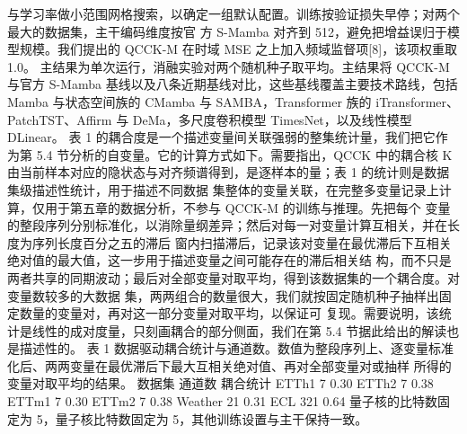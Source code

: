\documentclass[
]{article}
\begin{document}
与学习率做小范围网格搜索，以确定一组默认配置。训练按验证损失早停；对两个最大的数据集，主干编码维度按官
方 S-Mamba 对齐到 512，避免把增益误归于模型规模。我们提出的 QCCK-M
在时域 MSE 之上加入频域监督项{[}8{]}，该项权重取 1.0。
主结果为单次运行，消融实验对两个随机种子取平均。主结果将 QCCK-M 与官方
S-Mamba 基线以及八条近期基线对比，这些基线覆盖主要技术路线，包括 Mamba
与状态空间族的 CMamba 与 SAMBA，Transformer 族的
iTransformer、PatchTST、Affirm 与 DeMa，多尺度卷积模型
TimesNet，以及线性模型 DLinear。 表 1
的耦合度是一个描述变量间关联强弱的整集统计量，我们把它作为第 5.4
节分析的自变量。它的计算方式如下。需要指出，QCCK 中的耦合核 K
由当前样本对应的隐状态与对齐频谱得到，是逐样本的量；表 1
的统计则是数据集级描述性统计，用于描述不同数据
集整体的变量关联，在完整多变量记录上计算，仅用于第五章的数据分析，不参与
QCCK-M 的训练与推理。先把每个
变量的整段序列分别标准化，以消除量纲差异；然后对每一对变量计算互相关，并在长度为序列长度百分之五的滞后
窗内扫描滞后，记录该对变量在最优滞后下互相关绝对值的最大值，这一步用于描述变量之间可能存在的滞后相关结
构，而不只是两者共享的同期波动；最后对全部变量对取平均，得到该数据集的一个耦合度。对变量数较多的大数据
集，两两组合的数量很大，我们就按固定随机种子抽样出固定数量的变量对，再对这一部分变量对取平均，以保证可
复现。需要说明，该统计是线性的成对度量，只刻画耦合的部分侧面，我们在第
5.4 节据此给出的解读也是描述性的。 表 1
数据驱动耦合统计与通道数。数值为整段序列上、逐变量标准化后、两两变量在最优滞后下最大互相关绝对值、再对全部变量对或抽样
所得的变量对取平均的结果。 数据集 通道数 耦合统计 ETTh1 7 0.30 ETTh2 7
0.38 ETTm1 7 0.30 ETTm2 7 0.38 Weather 21 0.31 ECL 321 0.64
量子核的比特数固定为 5，量子核比特数固定为
5，其他训练设置与主干保持一致。
\end{document}
